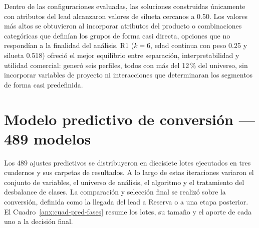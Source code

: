 Dentro de las configuraciones evaluadas, las soluciones construidas únicamente con
atributos del lead alcanzaron valores de silueta cercanos a 0.50. Los valores más
altos se obtuvieron al incorporar atributos del producto o combinaciones categóricas
que definían los grupos de forma casi directa, opciones que no respondían a la
finalidad del análisis. R1 ($k=6$, edad continua con peso 0.25 y silueta 0.518)
ofreció el mejor equilibrio entre separación, interpretabilidad y utilidad comercial:
generó seis perfiles, todos con más del 12\,\% del universo, sin incorporar variables
de proyecto ni interacciones que determinaran los segmentos de forma casi
predefinida.

\section{Modelo predictivo de conversión --- 489 modelos}

Los 489 ajustes predictivos se distribuyeron en diecisiete lotes ejecutados en tres
cuadernos y sus carpetas de resultados. A lo largo de estas iteraciones variaron el
conjunto de variables, el universo de análisis, el algoritmo y el tratamiento del
desbalance de clases. La comparación y selección final se realizó sobre la conversión,
definida como la llegada del lead a Reserva o a una etapa posterior. El
Cuadro~\ref{anx:cuad-pred-fases} resume los lotes, su tamaño y el aporte de cada uno a
la decisión final.

